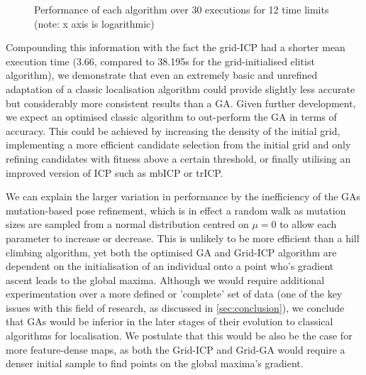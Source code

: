 \documentclass[authoryearcitations]{UoYCSproject}
\begin{document}
\begin{figure}
	\caption[Grid-ICP performance against Grid-Initialised GA] {Performance of each algorithm over 30 executions for 12 time limits (note: x axis is logarithmic)}
	\label{fig:icp_vs_grid_box_whiskers}
\end{figure}

Compounding this information with the fact the grid-ICP had a shorter mean execution time (3.66, compared to 38.195s for the grid-initialised elitist algorithm), we demonstrate that even an extremely basic and unrefined adaptation of a classic localisation algorithm could provide slightly less accurate but considerably more consistent results than a GA. Given further development, we expect an optimised classic algorithm to out-perform the GA in terms of accuracy. This could be achieved by increasing the density of the initial grid, implementing a more efficient candidate selection from the initial grid and only refining candidates with fitness above a certain threshold, or finally utilising an improved version of ICP such as mbICP or trICP. \newline

We can explain the larger variation in performance by the inefficiency of the GAs mutation-based pose refinement, which is in effect a random walk as mutation sizes are sampled from a normal distribution centred on $\mu=0$ to allow each parameter to increase or decrease. This is unlikely to be more efficient than a hill climbing algorithm, yet both the optimised GA and Grid-ICP algorithm are dependent on the initialisation of an individual onto a point who's gradient ascent leads to the global maxima. Although we would require additional experimentation over a more defined or 'complete' set of data (one of the key issues with this field of research, as discussed in \autoref{sec:conclusion}), we conclude that GAs would be inferior in the later stages of their evolution to classical algorithms for localisation. We postulate that this would be also be the case for more feature-dense maps, as both the Grid-ICP and Grid-GA would require a denser initial sample to find points on the global maxima's gradient.
\end{document}
